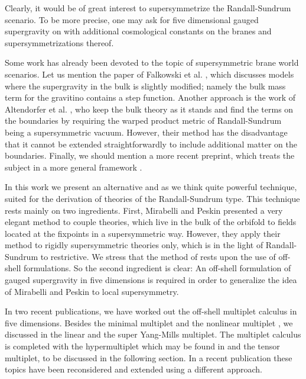 \documentclass[a4paper,12pt, twoside]{article}
\numberwithin{equation}{section}
\begin{document}
Clearly, it would be of great interest to supersymmetrize the 
Randall-Sundrum scenario. To be more precise, one may ask for five dimensional 
gauged supergravity \cite{D'Auria:1981kq} on \coordHE{} with 
additional cosmological constants on the branes and supersymmetrizations 
thereof. 

 Some work has already been devoted to the topic of supersymmetric 
brane world scenarios. Let us mention the paper of Falkowski et al. 
\cite{Falkowski:2000er}, which discusses models where the supergravity in the 
bulk is slightly modified; namely the bulk mass term for the gravitino 
contains a step function. Another approach is the work of Altendorfer 
et al. \cite{Altendorfer:2000rr}, who keep the bulk theory as it stands 
and find the terms on the boundaries by requiring the warped product 
metric of Randall-Sundrum being a supersymmetric vacuum. However, their 
method has the disadvantage that it cannot be extended straightforwardly 
to include additional matter on the boundaries. Finally, we should 
mention a more recent preprint, which treats the subject in a more general 
framework \cite{Bergshoeff:2000zn}.

In this work we present an alternative and as we think quite powerful 
technique, suited for the derivation of theories of the Randall-Sundrum 
type. This technique rests mainly on two ingredients. First, Mirabelli 
and Peskin \cite{Mirabelli:1998aj} presented a very elegant method to 
couple theories, which live in the bulk of the orbifold 
\coordHE{} to fields located at the fixpoints in a supersymmetric way. However, 
they apply their method to rigidly supersymmetric theories only, which 
is in the light of Randall-Sundrum to restrictive. We stress that the 
method of \cite{Mirabelli:1998aj} rests upon the use of off-shell 
formulations. So the second ingredient is clear: An off-shell formulation of 
gauged supergravity in five dimensions is required in order to 
generalize the idea of Mirabelli and Peskin to local supersymmetry. 

In two recent publications, we have worked out the \coordHE{} off-shell 
multiplet calculus in five dimensions. Besides the minimal multiplet and 
the nonlinear multiplet \cite {Zucker:2000ej}, we discussed in 
\cite{Zucker:1999fn} the linear and the super Yang-Mills multiplet. The multiplet 
calculus is completed with the hypermultiplet which may be found in 
\cite{diss} and the tensor multiplet, to be discussed in the following 
section. In a recent publication \cite{Kugo:2000hn} these topics have been 
reconsidered and extended using a different approach.
\end{document}
